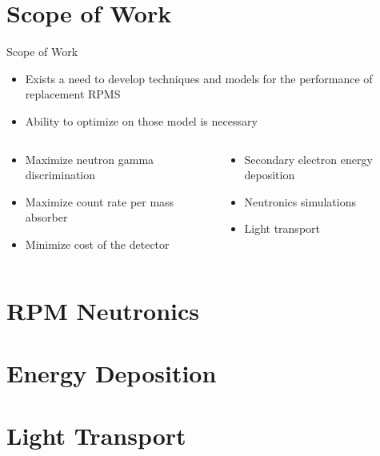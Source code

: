 \documentclass[compress]{beamer}
\begin{document}
\section{Scope of Work}
\begin{frame}{Scope of Work}
  \begin{itemize}
    \item Exists a need to develop techniques and models for the performance of replacement RPMS
    \item Ability to optimize on those model is necessary
  \end{itemize}
  \begin{columns}[onlytextwidth]
    \begin{column}{0.45\textwidth}
      \begin{itemize}
        \item Maximize neutron gamma discrimination
        \item Maximize count rate per mass absorber
        \item Minimize cost of the detector
      \end{itemize}
    \end{column}
    \begin{column}{0.45\textwidth}
      \begin{itemize}
        \item Secondary electron energy deposition
        \item Neutronics simulations
        \item Light transport 
      \end{itemize}
    \end{column}
  \end{columns}
\end{frame}
\section{RPM Neutronics}

\section{Energy Deposition}

\section{Light Transport}

\end{document}
